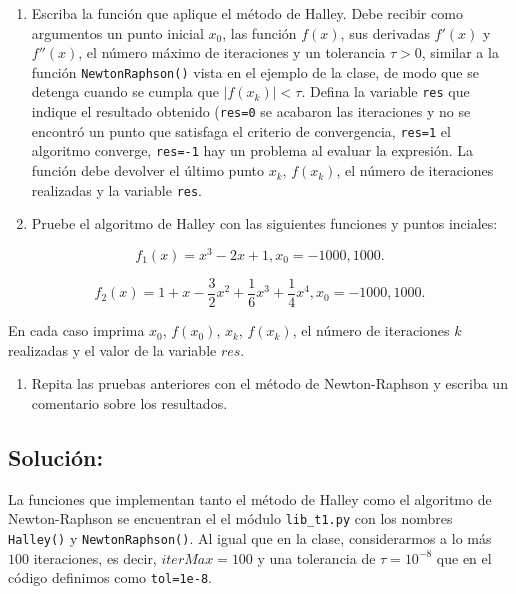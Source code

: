 \documentclass[11pt]{article}
\providecommand{\tightlist}{%
      \setlength{\itemsep}{0pt}\setlength{\parskip}{0pt}}
\begin{document}
\begin{enumerate}
\def\labelenumi{\arabic{enumi}.}
\item
  Escriba la función que aplique el método de Halley. Debe recibir como
  argumentos un punto inicial \(x_0\), las función \(f(x)\), sus
  derivadas \(f'(x)\) y \(f''(x)\), el número máximo de iteraciones y un
  tolerancia \(\tau>0\), similar a la función \texttt{NewtonRaphson()}
  vista en el ejemplo de la clase, de modo que se detenga cuando se
  cumpla que \(|f(x_k)|< \tau\). Defina la variable \texttt{res} que
  indique el resultado obtenido (\texttt{res=0} se acabaron las
  iteraciones y no se encontró un punto que satisfaga el criterio de
  convergencia, \texttt{res=1} el algoritmo converge, \texttt{res=-1}
  hay un problema al evaluar la expresión. La función debe devolver el
  último punto \(x_k\), \(f(x_k)\), el número de iteraciones realizadas
  y la variable \texttt{res}.
\item
  Pruebe el algoritmo de Halley con las siguientes funciones y puntos
  inciales:
\end{enumerate}

\[ f_1(x) =  x^3 - 2x + 1, x_0=-1000,1000. \]

\[ f_2(x) =  1 + x - \frac{3}{2}x^2 + \frac{1}{6}x^3 + \frac{1}{4}x^4, x_0=-1000,1000. \]

En cada caso imprima \(x_0\), \(f(x_0)\), \(x_k\), \(f(x_k)\), el número
de iteraciones \(k\) realizadas y el valor de la variable \(res\).

\begin{enumerate}
\def\labelenumi{\arabic{enumi}.}
\setcounter{enumi}{2}
\tightlist
\item
  Repita las pruebas anteriores con el método de Newton-Raphson y
  escriba un comentario sobre los resultados.
\end{enumerate}

\hypertarget{soluciuxf3n}{%
\subsection{Solución:}\label{soluciuxf3n}}

    La funciones que implementan tanto el método de Halley como el algoritmo
de Newton-Raphson se encuentran el el módulo \texttt{lib\_t1.py} con los
nombres \texttt{Halley()} y \texttt{NewtonRaphson()}. Al igual que en la
clase, considerarmos a lo más \(100\) iteraciones, es decir,
\(iterMax=100\) y una tolerancia de \(\tau=10^{-8}\) que en el código
definimos como \texttt{tol=1e-8}.
\end{document}
